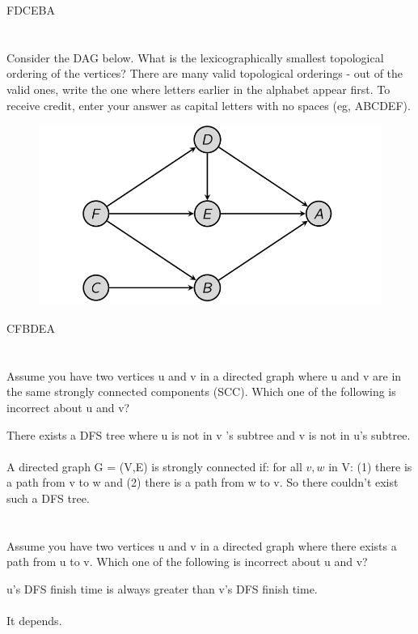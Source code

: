 \documentclass [12pt]{article}
\begin{document}
\begin{Solution}
FDCEBA
\end{Solution}


\section{} Consider the DAG below. What is the lexicographically smallest topological ordering of the vertices? There are many valid topological orderings - out of the valid ones, write the one where letters earlier in the alphabet appear first. To receive credit, enter your answer as capital letters with no spaces (eg, ABCDEF).
\begin{figure}[H]
    \centering
    \includegraphics[scale=0.5]{3.png} 
    \label{fig:my_label}
\end{figure}

\begin{Solution}
CFBDEA
\end{Solution}


\section{} Assume you have two vertices u and v in a directed graph where u and v are in the same strongly connected components (SCC). Which one of the following is incorrect about u and v?
 
\begin{Solution}
There exists a DFS tree where u is not in v 's subtree and v is not in u's subtree.
\paragraph{}

A directed graph G = (V,E) is strongly connected if: 
for all $v, w$ in V: (1) there is a path from v to w and (2) there is a path from w to v.
So there couldn't exist such a DFS tree. 
\end{Solution}


\section{} Assume you have two vertices u and v in a directed graph where there exists a path from u to v. Which one of the following is incorrect about u and v?

\begin{Solution}
u's DFS finish time is always greater than v's DFS finish time.
\paragraph{}
It depends.
\end{Solution}
\end{document}
